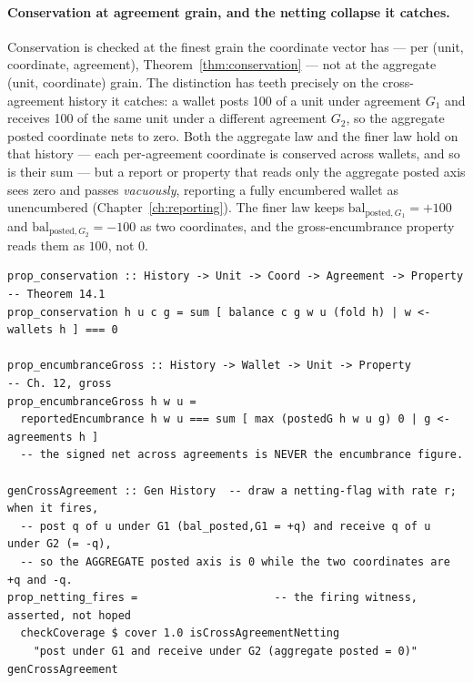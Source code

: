 \paragraph{Conservation at agreement grain, and the netting collapse it catches.}
Conservation is checked at the finest grain the coordinate vector has --- per (unit,
coordinate, agreement), Theorem~\ref{thm:conservation} --- not at the aggregate (unit,
coordinate) grain. The distinction has teeth precisely on the cross-agreement history it
catches: a wallet posts 100 of a unit under agreement $G_1$ and receives 100 of the
same unit under a different agreement $G_2$, so the aggregate posted coordinate nets to
zero. Both the aggregate law and the finer law hold on that history --- each per-agreement
coordinate is conserved across wallets, and so is their sum --- but a report or property
that reads only the aggregate posted axis sees zero and passes \emph{vacuously}, reporting
a fully encumbered wallet as unencumbered (Chapter~\ref{ch:reporting}). The finer law keeps
$\mathrm{bal}_{\text{posted},G_1}=+100$ and $\mathrm{bal}_{\text{posted},G_2}=-100$ as two
coordinates, and the gross-encumbrance property reads them as $100$, not $0$.

\begin{lstlisting}
prop_conservation :: History -> Unit -> Coord -> Agreement -> Property  -- Theorem 14.1
prop_conservation h u c g = sum [ balance c g w u (fold h) | w <- wallets h ] === 0

prop_encumbranceGross :: History -> Wallet -> Unit -> Property          -- Ch. 12, gross
prop_encumbranceGross h w u =
  reportedEncumbrance h w u === sum [ max (postedG h w u g) 0 | g <- agreements h ]
  -- the signed net across agreements is NEVER the encumbrance figure.

genCrossAgreement :: Gen History  -- draw a netting-flag with rate r; when it fires,
  -- post q of u under G1 (bal_posted,G1 = +q) and receive q of u under G2 (= -q),
  -- so the AGGREGATE posted axis is 0 while the two coordinates are +q and -q.
prop_netting_fires =                     -- the firing witness, asserted, not hoped
  checkCoverage $ cover 1.0 isCrossAgreementNetting
    "post under G1 and receive under G2 (aggregate posted = 0)" genCrossAgreement
\end{lstlisting}

